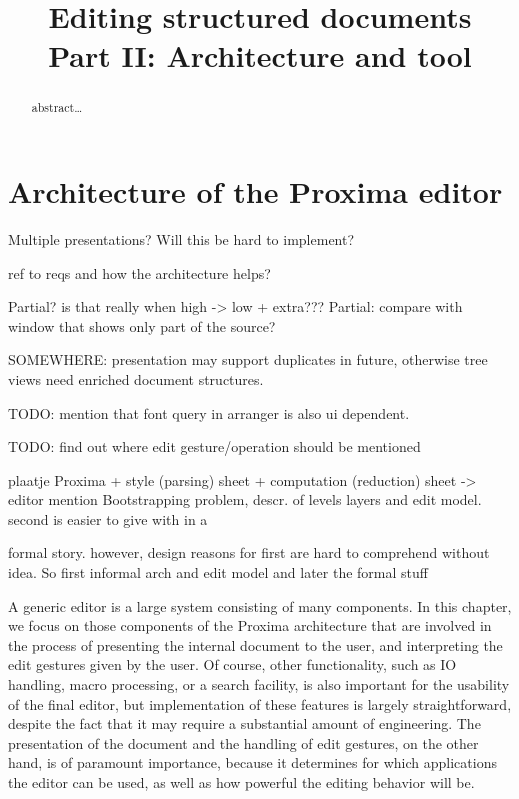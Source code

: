 \documentclass{speauth}
\begin{document}

  \title{Editing structured documents\\Part II: Architecture and tool} 
  \address{Institute of Information and Computing Sciences\\ Utrecht University\\
    Utrecht, The Netherlands}     
\begin{abstract} 
  abstract\dots
\end{abstract}

\section{Architecture of the Proxima editor} \label{chap:proxArch}

\bc
Multiple presentations? Will this be hard to implement?

ref to reqs and how the architecture helps?

Partial? is that really when high -> low + extra???
Partial: compare with window that shows only part of the source?

SOMEWHERE: presentation may support duplicates in future, otherwise tree views need enriched 
 document structures.

TODO: mention that font query in arranger is also ui dependent.

TODO: find out where edit gesture/operation should be mentioned

plaatje Proxima + style (parsing) sheet + computation (reduction) sheet -> editor mention Bootstrapping problem, descr. of levels layers and edit model. second is easier to give with in a

formal story. however, design reasons for first are hard to comprehend without idea. So first informal arch 
 and edit model and later the formal stuff
\ec




A generic editor is a large system consisting of many components. In this chapter, we focus on those components of the Proxima architecture that are involved in the process of presenting the internal document to the user, and interpreting the edit gestures given by the user. Of course, other functionality, such as IO handling, macro processing, or a search facility, is also important for the usability of the final editor, but implementation of these features is largely straightforward, despite the fact that it may require a substantial amount of engineering. The presentation of the document and the handling of edit gestures, on the other hand, is of paramount importance, because it determines for which applications the editor can be used, as well as how powerful the editing behavior will be.
\end{document}
